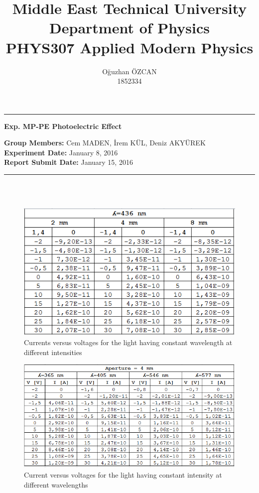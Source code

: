 \documentclass[a4paper,12pt]{article}
\title{Middle East Technical University\\Department of Physics\\\textbf{PHYS307 Applied Modern Physics}}
\author{Oğuzhan ÖZCAN\\1852334}
\date{}
\providecommand{\groupmember}[1]{\textbf{Group Members:} }
\providecommand{\expdate}[1]{\textbf{Experiment Date:} }
\providecommand{\repdate}[1]{\textbf{Report Submit Date:} }
\providecommand{\expname}[1]{\textbf{Exp. MP-PE Photoelectric Effect} }
\begin{document}
\maketitle

\thispagestyle{fancy}

\noindent\rule{18.4cm}{0.8pt}
\begin{center}
	\expname{arg1}{}
\end{center}
\groupmember{arg1}{Cem MADEN, İrem KÜL, Deniz AKYÜREK}\\
\expdate{November 6, 2015}{January 8, 2016}\\
\repdate{arg1}{January 15, 2016}\\
\noindent\rule{18.4cm}{0.8pt}\\\\
\begin{figure}[h!]
\centering
\includegraphics[scale = 0.7]{TABLE1}
\caption{Currents versus voltages for the light having constant wavelength at different intensities}
\label{fig:TABLE1}
\end{figure}
\begin{figure}[h!]
\centering
\includegraphics[scale = 0.7]{TABLE2}
\caption{Current versus voltages for the light having constant intensity at different wavelengths}
\label{fig:TABLE2}
\end{figure}
\end{document}
